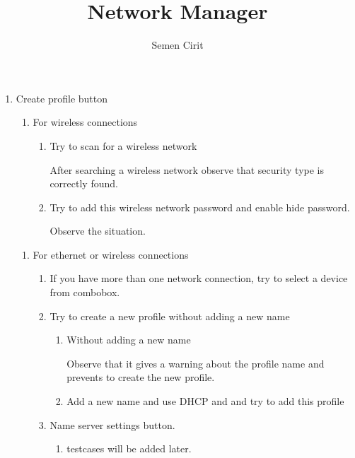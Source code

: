 \documentclass[a4paper,10pt]{article}
\title{Network Manager}
\author{Semen Cirit}
\begin{document}
\maketitle

\begin{enumerate}
\item Create profile button
    \begin{enumerate}
    \item For wireless connections
        \begin{enumerate}
        \item Try to scan for a wireless network
    
            After searching a wireless network observe that security type is correctly found.
        \item Try to add this wireless network password and enable hide password.
    
            Observe the situation.
        \end{enumerate}
    \end{enumerate}

    \begin{enumerate}
    \item For ethernet or wireless connections
        \begin{enumerate}
        \item If you have more than one network connection, try to select a device from combobox.
        \item Try to create a new profile without adding a new name
            \begin{enumerate}
            \item Without adding a new name
    
                Observe that it gives a warning about the profile name and prevents to create the new profile.
    
            \item Add a new name and use DHCP and  and try to add this profile
            \end{enumerate}

        \item Name server settings button.
            \begin{enumerate}
            \item testcases will be added later.
            \end{enumerate}
        \end{enumerate}
    \end{enumerate}


\end{enumerate}
\end{document}
